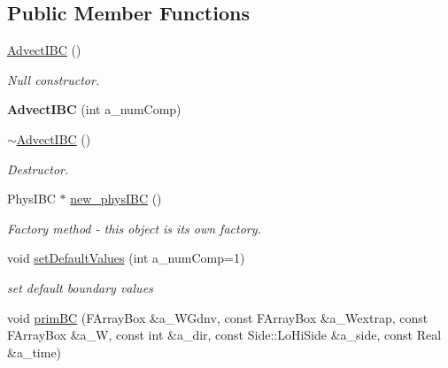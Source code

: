 \subsection*{Public Member Functions}
\begin{DoxyCompactItemize}
\item 
\hypertarget{class_advect_i_b_c_af2d3f4fff7f08be3e1e3f140034bc34c}{\hyperlink{class_advect_i_b_c_af2d3f4fff7f08be3e1e3f140034bc34c}{Advect\-I\-B\-C} ()}\label{class_advect_i_b_c_af2d3f4fff7f08be3e1e3f140034bc34c}

\begin{DoxyCompactList}\small\item\em Null constructor. \end{DoxyCompactList}\item 
\hypertarget{class_advect_i_b_c_a8897e6ad80cdff2121c4d4f6ce922ce1}{{\bfseries Advect\-I\-B\-C} (int a\-\_\-num\-Comp)}\label{class_advect_i_b_c_a8897e6ad80cdff2121c4d4f6ce922ce1}

\item 
\hypertarget{class_advect_i_b_c_a4d1d956949384ad8621ba145de87952e}{\hyperlink{class_advect_i_b_c_a4d1d956949384ad8621ba145de87952e}{$\sim$\-Advect\-I\-B\-C} ()}\label{class_advect_i_b_c_a4d1d956949384ad8621ba145de87952e}

\begin{DoxyCompactList}\small\item\em Destructor. \end{DoxyCompactList}\item 
Phys\-I\-B\-C $\ast$ \hyperlink{class_advect_i_b_c_a4d092d4a393e169a87f7df920d09a2b0}{new\-\_\-phys\-I\-B\-C} ()
\begin{DoxyCompactList}\small\item\em Factory method -\/ this object is its own factory. \end{DoxyCompactList}\item 
\hypertarget{class_advect_i_b_c_ae2edb5fa139b1655c3d7d87416da7023}{void \hyperlink{class_advect_i_b_c_ae2edb5fa139b1655c3d7d87416da7023}{set\-Default\-Values} (int a\-\_\-num\-Comp=1)}\label{class_advect_i_b_c_ae2edb5fa139b1655c3d7d87416da7023}

\begin{DoxyCompactList}\small\item\em set default boundary values \end{DoxyCompactList}\item 
\hypertarget{class_advect_i_b_c_af222561d9fba9498f4fc647a9e37547a}{void \hyperlink{class_advect_i_b_c_af222561d9fba9498f4fc647a9e37547a}{prim\-B\-C} (F\-Array\-Box \&a\-\_\-\-W\-Gdnv, const F\-Array\-Box \&a\-\_\-\-Wextrap, const F\-Array\-Box \&a\-\_\-\-W, const int \&a\-\_\-dir, const Side\-::\-Lo\-Hi\-Side \&a\-\_\-side, const Real \&a\-\_\-time)}\label{class_advect_i_b_c_af222561d9fba9498f4fc647a9e37547a}


\end{DoxyCompactItemize}

